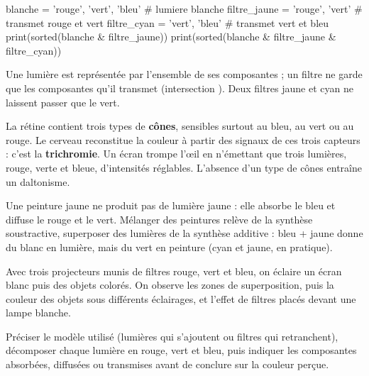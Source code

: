 \begin{python}
blanche = {'rouge', 'vert', 'bleu'}       # lumiere blanche
filtre_jaune = {'rouge', 'vert'}          # transmet rouge et vert
filtre_cyan = {'vert', 'bleu'}            # transmet vert et bleu
print(sorted(blanche & filtre_jaune))
print(sorted(blanche & filtre_jaune & filtre_cyan))
\end{python}
\begin{console}
\end{console}
\noindent{} Une lumière est représentée par l'ensemble de ses composantes ; un filtre ne garde que les composantes qu'il
transmet (intersection \code{\&}). Deux filtres jaune et cyan ne laissent passer que le vert.
\begin{propriete}[Trichromie]
La rétine contient trois types de \textbf{cônes}, sensibles surtout au bleu, au vert ou au rouge. Le cerveau reconstitue la couleur à partir des
signaux de ces trois capteurs : c'est la \textbf{trichromie}. Un écran trompe l'œil en n'émettant que trois lumières, rouge, verte et bleue,
d'intensités réglables. L'absence d'un type de cônes entraîne un daltonisme.
\end{propriete}
\begin{attention}
Une peinture jaune ne produit pas de lumière jaune : elle absorbe le bleu et diffuse le rouge et le vert. Mélanger des peintures relève
de la synthèse soustractive, superposer des lumières de la synthèse additive : bleu + jaune donne du blanc en lumière, mais du vert en
peinture (cyan et jaune, en pratique).
\end{attention}
\begin{experience}
Avec trois projecteurs munis de filtres rouge, vert et bleu, on éclaire un écran blanc puis des objets colorés. On observe les zones de
superposition, puis la couleur des objets sous différents éclairages, et l'effet de filtres placés devant une lampe blanche.
\end{experience}
\begin{rediger}
Préciser le modèle utilisé (lumières qui s'ajoutent ou filtres qui retranchent), décomposer chaque lumière en rouge, vert et bleu,
puis indiquer les composantes absorbées, diffusées ou transmises avant de conclure sur la couleur perçue.
\end{rediger}
\exercices

